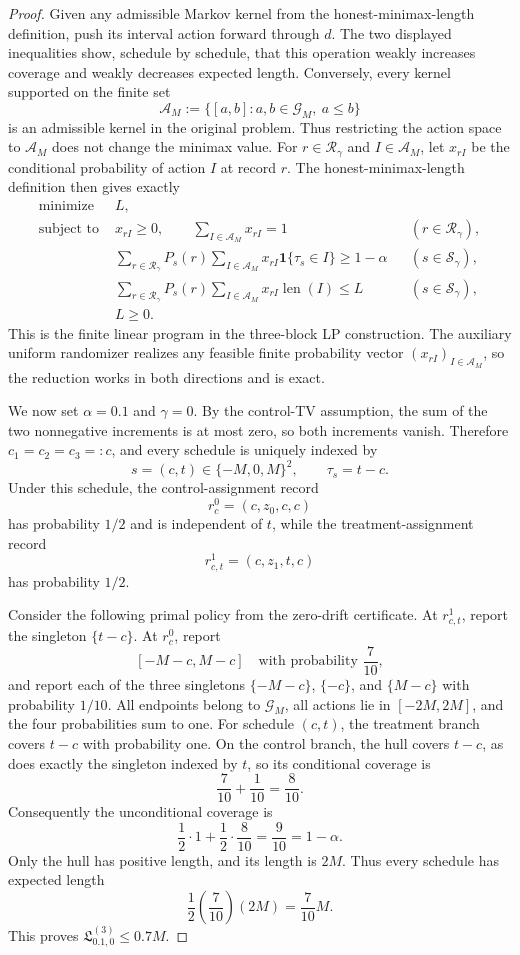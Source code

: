 \documentclass{article}
\begin{document}
\begin{proof}
Given any admissible Markov kernel from the honest-minimax-length definition, push its interval action forward through \(d\).  The two displayed inequalities show, schedule by schedule, that this operation weakly increases coverage and weakly decreases expected length.  Conversely, every kernel supported on the finite set
\[
\mathcal A_M:=\{[a,b]:a,b\in\mathcal G_M,\ a\le b\}
\]
is an admissible kernel in the original problem.  Thus restricting the action space to \(\mathcal A_M\) does not change the minimax value.  For \(r\in\mathcal R_\gamma\) and \(I\in\mathcal A_M\), let \(x_{rI}\) be the conditional probability of action \(I\) at record \(r\).  The honest-minimax-length definition then gives exactly
\[
\begin{aligned}
\text{minimize }&L,\\
\text{subject to }&x_{rI}\ge0,\qquad \sum_{I\in\mathcal A_M}x_{rI}=1 &&(r\in\mathcal R_\gamma),\\
&\sum_{r\in\mathcal R_\gamma}P_s(r)\sum_{I\in\mathcal A_M}x_{rI}\mathbf 1\{\tau_s\in I\}\ge1-\alpha &&(s\in\mathcal S_\gamma),\\
&\sum_{r\in\mathcal R_\gamma}P_s(r)\sum_{I\in\mathcal A_M}x_{rI}\operatorname{len}(I)\le L &&(s\in\mathcal S_\gamma),\\
&L\ge0.
\end{aligned}
\]
This is the finite linear program in the three-block LP construction.  The auxiliary uniform randomizer realizes any feasible finite probability vector \((x_{rI})_{I\in\mathcal A_M}\), so the reduction works in both directions and is exact.

We now set \(\alpha=0.1\) and \(\gamma=0\).  By the control-TV assumption, the sum of the two nonnegative increments is at most zero, so both increments vanish.  Therefore \(c_1=c_2=c_3=:c\), and every schedule is uniquely indexed by
\[
s=(c,t)\in\{-M,0,M\}^{2},\qquad \tau_s=t-c.
\]
Under this schedule, the control-assignment record
\[
r_c^0=(c,z_0,c,c)
\]
has probability \(1/2\) and is independent of \(t\), while the treatment-assignment record
\[
r_{c,t}^1=(c,z_1,t,c)
\]
has probability \(1/2\).

Consider the following primal policy from the zero-drift certificate.  At \(r_{c,t}^1\), report the singleton \(\{t-c\}\).  At \(r_c^0\), report
\[
[-M-c,M-c]\quad\text{with probability }\frac7{10},
\]
and report each of the three singletons \(\{-M-c\}\), \(\{-c\}\), and \(\{M-c\}\) with probability \(1/10\).  All endpoints belong to \(\mathcal G_M\), all actions lie in \([-2M,2M]\), and the four probabilities sum to one.  For schedule \((c,t)\), the treatment branch covers \(t-c\) with probability one.  On the control branch, the hull covers \(t-c\), as does exactly the singleton indexed by \(t\), so its conditional coverage is
\[
\frac7{10}+\frac1{10}=\frac8{10}.
\]
Consequently the unconditional coverage is
\[
\frac12\cdot1+\frac12\cdot\frac8{10}=\frac9{10}=1-\alpha.
\]
Only the hull has positive length, and its length is \(2M\).  Thus every schedule has expected length
\[
\frac12\left(\frac7{10}\right)(2M)=\frac7{10}M.
\]
This proves \(\mathfrak L^{(3)}_{0.1,0}\le0.7M\).


\end{proof}
\end{document}
